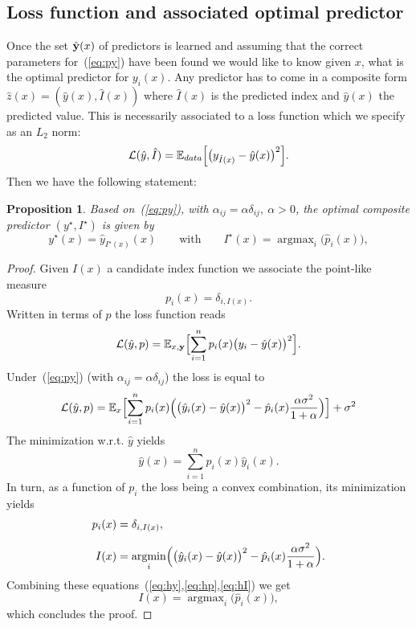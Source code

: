 \documentclass[envcountsect,runningheads]{llncs}
\theoremstyle{etoile}
\newtheorem{prop}{Proposition}[section]
\DeclareMathOperator*{\argmin}{argmin}
\DeclareMathOperator*{\argmax}{argmax}
\begin{document}
\subsection{Loss function and associated optimal predictor}
Once the set $\hat {\bf y}(x)$ of predictors is learned and assuming that the correct parameters for~(\ref{eq:py}) have been found
we would like to know given $x$, what is the optimal predictor for $y_i(x)$. Any predictor has  to come in a composite form
$\hat z(x) = (\hat y(x),\hat I(x))$ where $\hat I(x)$ is the predicted index and $\hat y(x)$ the predicted value.
This is necessarily associated to a loss function 
which we specify as an $L_2$ norm:
\[
{\cal L}(\hat y,\hat I) = {\mathbb E}_{data}\Bigl[\bigl(y_{\hat I(x)}-\hat y(x)\bigr)^2\Bigr]. 
\]
Then we have the following statement:
\begin{prop}
Based on~(\ref{eq:py}), with $\alpha_{ij} = \alpha\delta_{ij},\ \alpha>0$, the optimal composite predictor $(y^\star,I^\star)$ is given by
\[
y^\star(x) = \hat y_{I^\star(x)}(x)\qquad\text{with}\qquad I^\star(x) = \argmax_{i} \bigl(\hat p_i(x)\bigr), 
\]
\end{prop}
\begin{proof}
Given $I(x)$ a candidate index function we associate the point-like measure
\[
p_i(x) = \delta_{i,I(x)}.
\]
Written in terms of $p$ the loss function reads
\[
{\cal L}(\hat y,p) = {\mathbb E}_{x,{\bf y}}\Bigl[\sum_{i=1}^n p_i(x)\bigl(y_i-\hat y(x)\bigr)^2\Bigr].
\]
Under~(\ref{eq:py}) (with $\alpha_{ij}=\alpha\delta_{ij}$) the loss is equal to
\[
{\cal L}(\hat y,p) = {\mathbb E}_x\Bigl[\sum_{i=1}^n p_i(x)\Bigl( \bigl(\hat y_i(x)-\hat y(x)\bigr)^2-\hat p_i(x)\frac{\alpha\sigma^2}{1+\alpha}\Bigr)\Bigr]+\sigma^2
\]
The minimization w.r.t. $\hat y$ yields
\begin{equation}\label{eq:hy}
\hat y(x) = \sum_{i=1}^n p_i(x)\hat y_i(x).
\end{equation}
In turn, as a function of $p_i$ the loss being a  convex combination, its minimization yields
\begin{align}
  p_i(x) &= \delta_{i,I(x)},\label{eq:hp}\\[0.2cm]
  I(x) &= \argmin_i\Bigl(\bigl(\hat y_i(x)-\hat y(x)\bigr)^2-\hat p_i(x)\frac{\alpha\sigma^2}{1+\alpha}\Bigr).\label{eq:hI}
\end{align}
Combining these equations~(\ref{eq:hy},\ref{eq:hp},\ref{eq:hI}) we get
\[
I(x) = \argmax_i\bigl(\hat p_i(x)\bigr),
\]
which concludes the proof.  
\end{proof}
\end{document}
